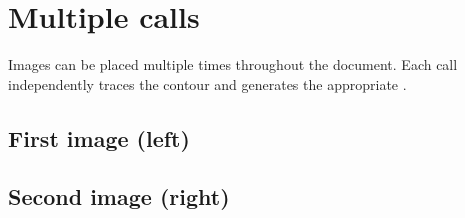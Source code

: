 \documentclass{article}
\begin{document}
\section*{Multiple \texttt{\string\wrapgraphics} calls}

Images can be placed multiple times throughout the document.
Each call independently traces the contour and generates
the appropriate \texttt{\string\parshape}.

\subsection*{First image (left)}

\lipsum[1-2]

\subsection*{Second image (right)}

\lipsum[3-6]
\end{document}
